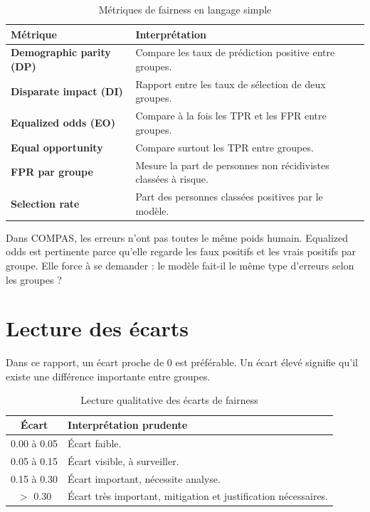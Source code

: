 \documentclass[12pt,a4paper]{report}
\begin{document}
\begin{table}[H]
\centering
\caption{Métriques de fairness en langage simple}
\begin{tabularx}{\textwidth}{>{\bfseries\color{primarydark}}l X}
\toprule
Métrique & Interprétation \\
\midrule
Demographic parity (DP) & Compare les taux de prédiction positive entre groupes. \\
Disparate impact (DI) & Rapport entre les taux de sélection de deux groupes. \\
Equalized odds (EO) & Compare à la fois les TPR et les FPR entre groupes. \\
Equal opportunity & Compare surtout les TPR entre groupes. \\
FPR par groupe & Mesure la part de personnes non récidivistes classées à risque. \\
Selection rate & Part des personnes classées positives par le modèle. \\
\bottomrule
\end{tabularx}
\end{table}

\begin{tcolorbox}[primarybox, title={Pourquoi Equalized Odds est centrale ici}]
Dans COMPAS, les erreurs n'ont pas toutes le même poids humain. Equalized odds est pertinente parce qu'elle regarde les faux positifs et les vrais positifs par groupe. Elle force à se demander : \og le modèle fait-il le même type d'erreurs selon les groupes ? \fg{}
\end{tcolorbox}

\section{Lecture des écarts}

Dans ce rapport, un écart proche de 0 est préférable. Un écart élevé signifie qu'il existe une différence importante entre groupes.

\begin{table}[H]
\centering
\caption{Lecture qualitative des écarts de fairness}
\begin{tabularx}{\textwidth}{c X}
\toprule
\textbf{Écart} & \textbf{Interprétation prudente} \\
\midrule
0.00 à 0.05 & Écart faible. \\
0.05 à 0.15 & Écart visible, à surveiller. \\
0.15 à 0.30 & Écart important, nécessite analyse. \\
$>$ 0.30 & Écart très important, mitigation et justification nécessaires. \\
\bottomrule
\end{tabularx}
\end{table}
\end{document}

